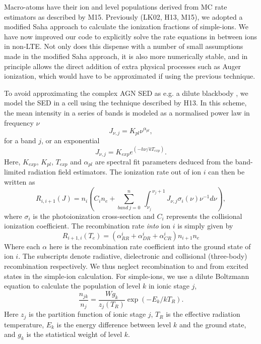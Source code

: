 \documentclass[preprint, a4paper, 11pt]{aastex}
\begin{document}
Macro-atoms have their ion and level populations derived from
MC rate estimators as described by M15. Previously (LK02, H13, M15),
we adopted a modified Saha approach to calculate the ionization fractions
of simple-ions. We have now improved our code to explicitly solve the 
rate equations in between ions in non-LTE. 
Not only does this
dispense with a number of small assumptions made in the modified Saha approach, 
it is also more numerically stable, 
and in principle allows the direct addition of extra physical 
processes such as Auger ionization, which would have to be approximated 
if using the previous technique.

To avoid approximating the complex AGN SED as e.g. a dilute blackbody \citep[][M15]{ML93},
we model the SED in a cell using the technique described by H13. In this scheme,
the mean intensity in a series of bands is modeled as a normalised power law in 
frequency $\nu$
\begin{equation}
J_{\nu,j}=K_{pl}\nu^{\alpha_{pl}},
\end{equation}
for a band $j$, or an exponential 
\begin{equation}
J_{\nu,j}=K_{exp} e^{(-h\nu/k T_{exp})}.
\end{equation}
Here, $K_{exp}$, $K_{pl}$, $T_{exp}$ and $\alpha_{pl}$ are spectral fit parameters
deduced from the band-limited radiation field estimators.
The ionization rate out of ion $i$ can then be written as 
\begin{equation}
R_{i,i+1}(J)= 
\displaystyle{
n_i \left(C_{i} n_e + 
\sum_{band~j=0}^{n}~
{\int_{\nu_j}^{~\nu_j+1}{J_{\nu,j}\sigma_i(\nu)\nu^{-1}d\nu}}
\right),}
\end{equation}
where $\sigma_i$ is the photoionization cross-section and $C_{i}$
represents the collisional ionization coefficient.
The recombination rate {\em into} ion $i$ is simply given by 
\begin{equation}
R_{i+1,i}(T_e) = (\alpha^i_{RR} + \alpha^i_{DR} + \alpha^i_{CR}) n_{i+1} n_e
\end{equation}
Where each $\alpha$ here is the recombination rate coefficient into the ground state of ion $i$.
The subscripts denote radiative, dielectronic and 
collisional (three-body) recombination respectively.
We thus neglect recombination to and from excited states in the simple-ion calculation. 
For simple-ions, we use a dilute Boltzmann equation to calculate 
the population of level $k$ in ionic stage $j$,
\begin{equation}
\frac{n_{jk}}{n_j} = \frac{W g_k}{z_j(T_R)} \exp(-E_k/kT_R).
\end{equation}
Here $z_j$ is the partition function of ionic stage $j$,
$T_R$ is the effective radiation temperature,
$E_k$ is the energy difference between level $k$ and the ground state,
and $g_k$ is the statistical weight of level $k$. 
\end{document}
